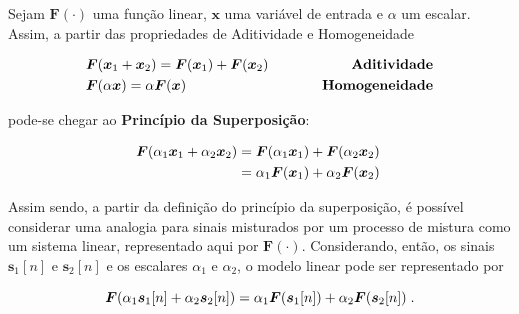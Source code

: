 \begin{definition}
    Sejam $\bm{F}(\cdot)$ uma função linear, $\bm{x}$ uma variável de entrada e $\alpha$ um escalar. Assim, a partir das propriedades de Aditividade e Homogeneidade

    \begin{equation*}
        \begin{aligned}
            & \bm{F}(\bm{x}_{1} + \bm{x}_{2}) = \bm{F}(\bm{x}_{1}) + \bm{F}(\bm{x}_{2}) \hspace{0.5cm}& \text{\textbf{Aditividade}} \\
            & \bm{F}(\alpha \bm{x}) = \alpha \bm{F}(\bm{x}) & \hspace{0.5cm} \text{\textbf{Homogeneidade}}
        \end{aligned}
        \vspace{0.2cm}
    \end{equation*}

    \noindent pode-se chegar ao \textbf{Princípio da Superposição}:

    \begin{equation}
        \begin{aligned}
            \bm{F}(\alpha_{1} \bm{x}_{1} + \alpha_{2} \bm{x}_{2}) & = \bm{F}(\alpha_{1} \bm{x}_{1}) + \bm{F}(\alpha_{2} \bm{x}_{2})\\
             & = \alpha_{1} \bm{F}(\bm{x}_{1}) + \alpha_{2} \bm{F}(\bm{x}_{2})
        \end{aligned}
        \hspace{0.1cm}
        \vspace{0.2cm}
    \end{equation}

\end{definition}

Assim sendo, a partir da definição do princípio da superposição, é possível considerar uma analogia para sinais misturados por um processo de mistura como um sistema linear, representado aqui por $\bm{F}(\cdot)$. Considerando, então, os sinais $\bm{s}_{1}[n]$ e $\bm{s}_{2}[n]$ e os escalares $\alpha_{1}$ e $\alpha_{2}$, o modelo linear pode ser representado por

\begin{equation}
    \bm{F}(\alpha_{1} \bm{s}_{1}[n] + \alpha_{2} \bm{s}_{2}[n]) = \alpha_{1} \bm{F}(\bm{s}_{1}[n]) + \alpha_{2} \bm{F}(\bm{s}_{2}[n])
    \hspace{0.1cm}.
    \vspace{0.2cm}
    \label{eq:bss_superpos}
\end{equation}

